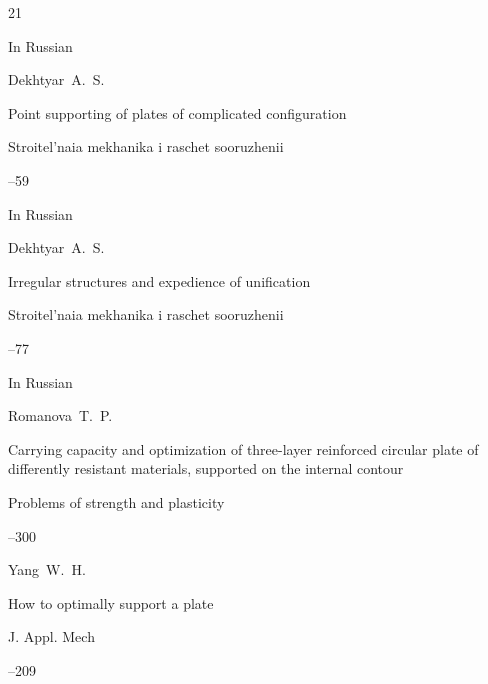 \begin{thebibliography}{21}






\lang In Russian

\by Dekhtyar~A.~S.

\paper Point supporting of plates of complicated configuration

\jour Stroitel'naia mekhanika i raschet sooruzhenii



--59




\lang In Russian

\by Dekhtyar~A.~S.

\paper Irregular structures and expedience of unification

\jour Stroitel'naia mekhanika i raschet sooruzhenii



--77








\lang In Russian

\by Romanova~T.~P.

\paper Carrying capacity and optimization of three-layer reinforced circular plate of differently resistant materials, supported on the internal contour

\jour Problems of strength and plasticity



--300






\by Yang~W.~H.

\paper How to optimally support a plate

\jour J. Appl. Mech




--209









\end{thebibliography}
